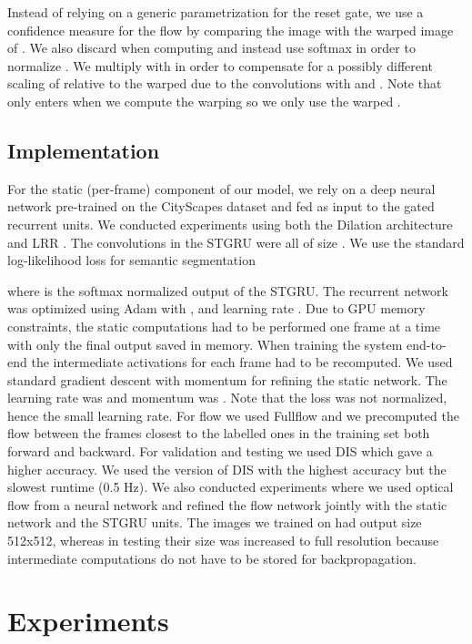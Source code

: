 \documentclass[10pt,twocolumn,letterpaper]{article}
\begin{document}
Instead of relying on a generic parametrization for the reset gate, we use a confidence measure for the flow by comparing the image  with the warped image of . We also discard  when computing  and instead use softmax in order to normalize . We multiply with  in order to compensate for a possibly different scaling of  relative to the warped  due to the convolutions with  and . Note that  only enters when we compute the warping  so we only use the warped .

\subsection{Implementation}

For the static (per-frame) component of our model, we rely on a deep neural network pre-trained on the CityScapes dataset and fed as input to the gated recurrent units. We conducted experiments using both the Dilation architecture \cite{yu2015multi} and LRR \cite{lrr4x}.
The convolutions in the STGRU were all of size . We use the standard log-likelihood loss for semantic segmentation

where  is the softmax normalized output of the STGRU. The recurrent network was optimized using Adam \cite{kingma2014adam} with ,  and learning rate . Due to GPU memory constraints, the static computations had to be performed one frame at a time with only the final output saved in memory. When training the system end-to-end the intermediate activations for each frame had to be recomputed. We used standard gradient descent with momentum for refining the static network. The learning rate was  and momentum was . Note that the loss was not normalized, hence the small learning rate. For flow we used Fullflow \cite{chen2016full} and we precomputed the flow between the frames closest to the labelled ones in the training set both forward and backward. For validation and testing we used DIS \cite{kroeger2016fast} which gave a higher accuracy. We used the version of DIS with the highest accuracy but the slowest runtime (0.5 Hz). We also conducted experiments where we used optical flow from a neural network \cite{fischer2015flownet} and refined the flow network jointly with the static network and the STGRU units. The images we trained on had output size 512x512, whereas in testing their size was increased to full resolution because intermediate computations do not have to be stored for backpropagation. 

\section{Experiments}
\end{document}
